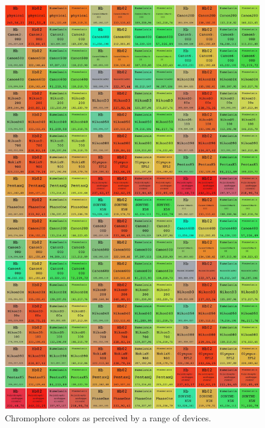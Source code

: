 








\begin{figure}[h!]
  \centering
    \includegraphics[width=0.99\textwidth]{Chapter1/Figs/CameraComparison.jpg}
    \caption{Chromophore colors as perceived by a range of devices.}  \label{fig:CameraComparison}
\end{figure}


